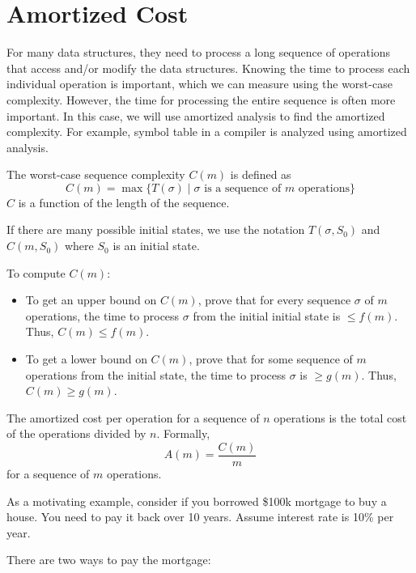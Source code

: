 \section{Amortized Cost}

For many data structures, they need to process a long sequence of operations that access and/or modify the data structures. Knowing the time to process each individual operation is important, which we can measure using the worst-case complexity. However, the time for processing the entire sequence is often more important. In this case, we will use amortized analysis to find the amortized complexity. For example, symbol table in a compiler is analyzed using amortized analysis.

\begin{definition}
    The worst-case sequence complexity $C(m)$ is defined as
    $$
    C(m) = \max \{ T(\sigma) \mid \text{$\sigma$ is a sequence of $m$ operations} \}
    $$
    $C$ is a function of the length of the sequence.
\end{definition}

If there are many possible initial states, we use the notation $T(\sigma, S_0)$ and $C(m,S_0)$ where $S_0$ is an initial state.

To compute $C(m)$:

\begin{itemize}
    \item To get an upper bound on $C(m)$, prove that for every sequence $\sigma$ of $m$ operations, the time to process $\sigma$ from the initial initial state is $\leq f(m)$. Thus, $C(m) \leq f(m)$.
    \item To get a lower bound on $C(m)$, prove that for some sequence of $m$ operations from the initial state, the time to process $\sigma$ is $\geq g(m)$. Thus, $C(m) \geq g(m)$.
\end{itemize}

\begin{definition} 
    The amortized cost per operation for a sequence of $n$ operations is the total cost of the operations divided by $n$. Formally,
    $$
    A(m) = \frac{C(m)}{m}
    $$
    for a sequence of $m$ operations.
\end{definition}

As a motivating example, consider if you borrowed \$100k mortgage to buy a house. You need to pay it back over 10 years. Assume interest rate is 10\% per year.

There are two ways to pay the mortgage:

